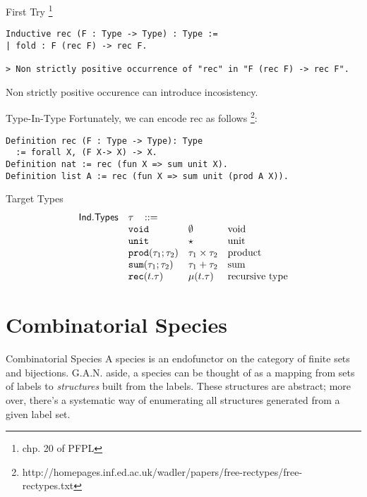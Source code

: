 \documentclass{beamer}
\newcommand{\ms}[1]{\ensuremath{\mathsf{#1}}}
\newcommand{\irl}[1]{\mathtt{#1}}
\begin{document}
\begin{frame}[fragile]{First Try}
\footnote{chp. 20 of PFPL}
\begin{verbatim}
Inductive rec (F : Type -> Type) : Type :=
| fold : F (rec F) -> rec F.

> Non strictly positive occurrence of "rec" in "F (rec F) -> rec F".
\end{verbatim}
Non strictly positive occurence can introduce incosistency.
\end{frame}

\begin{frame}[fragile]{Type-In-Type}
Fortunately, we can encode rec as follows
\footnote{http://homepages.inf.ed.ac.uk/wadler/papers/free-rectypes/free-rectypes.txt}:
\begin{verbatim}
Definition rec (F : Type -> Type): Type 
  := forall X, (F X-> X) -> X.
Definition nat := rec (fun X => sum unit X).
Definition list A := rec (fun X => sum unit (prod A X)).
\end{verbatim}
\end{frame}

\begin{frame}[fragile]{Target Types}
\[
\begin{array}{r l l l l}
\ms{Ind. Types} & \tau \,\,\,\,\, ::= \\
	& \irl{void}                	 			& \emptyset											& \text{void}\\
	& \irl{unit}                	 			& \star											& \text{unit}\\
	& \irl{prod}(\tau_1;\tau_2)					& \tau_1 \times \tau_2			&\text{product}\\
	& \irl{sum}(\tau_1;\tau_2)					& \tau_1 + \tau_2			&\text{sum}\\
	& \irl{rec}(t.\tau)								& \mu(t.\tau)					&\text{recursive type}
  \\
\end{array}
\]
\end{frame}

\section{Combinatorial Species}

\begin{frame}{Combinatorial Species}
A species is an endofunctor on the category of finite sets and bijections. G.A.N. aside, 
a species can be thought of as a mapping from sets of labels to \emph{structures} built from the 
labels. These structures are abstract; more over, there's a systematic way of enumerating all structures
generated from a given label set.
\end{frame}
\end{document}

